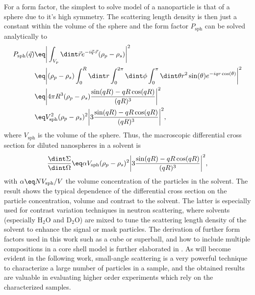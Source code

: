 \documentclass[\main/dresen_thesis.tex]{subfiles}
\begin{document}
    For a form factor, the simplest to solve model of a nanoparticle is that of a sphere due to it's high symmetry.
    The scattering length density is then just a constant within the volume of the sphere and the form factor $P_\mathrm{sph}$ can be solved analytically to
    \begin{align}
      P_\mathrm{sph} (\vec{q})
      \eq & \bigg|\int_{V_{p}} \dint \vec{r} e^{-i\vec{q} \cdot \vec{r}} (\rho_p - \rho_s) \bigg|^2 \\
      \eq & \bigg|(\rho_p - \rho_s) \int_0^R \dint r \int_0^{2 \pi} \dint \phi \int_0^\pi \dint \theta r^2 \sin(\theta) e^{-i q r \cos(\theta)}  \bigg|^2 \\
      \eq &  \bigg| 4\pi R^3 (\rho_p - \rho_s) \frac{\sin(qR) - qR\cos(qR)}{(qR)^3}  \bigg|^2\\
      \eq & V_\mathrm{sph}^2 (\rho_p - \rho_s)^2 \bigg|3 \frac{\sin(qR) - qR\cos(qR)}{(qR)^3}  \bigg|^2,
    \end{align}
    where $V_\mathrm{sph}$ is the volume of the sphere.
    Thus, the macroscopic differential cross section for diluted nanospheres in a solvent is
    \begin{align}
      \frac{\dint \Sigma}{\dint \Omega}
      \eq \alpha V_\mathrm{sph} (\rho_p - \rho_s)^2 \bigg|3 \frac{\sin(qR) - qR\cos(qR)}{(qR)^3}  \bigg|^2,
    \end{align}
    with $\alpha \eq NV_\mathrm{sph} / V$ the volume concentration of the particles in the solvent.
    The result shows the typical dependence of the differential cross section on the particle concentration, volume and contrast to the solvent.
    The latter is especially used for contrast variation techniques in neutron scattering, where solvents (especially $\mathrm{H_2O}$ and $\mathrm{D_2O}$) are mixed to tune the scattering length density of the solvent to enhance the signal or mask particles.
    The derivation of further form factors used in this work such as a cube or superball, and how to include multiple compositions in a core shell model is further elaborated in .
    As will become evident in the following work, small-angle scattering is a very powerful technique to characterize a large number of particles in a sample, and the obtained results are valuable in evaluating higher order experiments which rely on the characterized samples.
\end{document}
